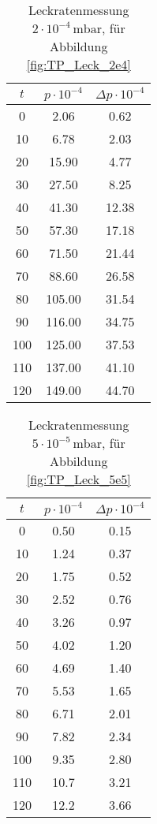 \begin{table}[H]
    \centering
    \caption{Leckratenmessung $2 \cdot 10^{-4} \, \si{\milli\bar}$, für Abbildung \ref{fig:TP_Leck_2e4}}
    \label{tab:TP_Leck_2e4}
    \begin{tabular}{c c c}
        \toprule
        {$t$} & {$p \cdot 10^{-4}$} & {$\Delta p \cdot 10^{-4}$} \\
        \midrule
        0 &   2.06 & 0.62\\
        10 &  6.78 & 2.03\\
        20 &  15.90 & 4.77\\
        30 &  27.50 & 8.25\\
        40 &  41.30 & 12.38\\
        50 &  57.30 & 17.18\\
        60 &  71.50 & 21.44\\
        70 &  88.60 & 26.58\\
        80 &  105.00 & 31.54\\
        90 &  116.00 & 34.75\\
        100 & 125.00 & 37.53\\
        110 & 137.00 & 41.10\\
        120 & 149.00 & 44.70\\
        \bottomrule
    \end{tabular}
\end{table}

\begin{table}[H]
    \centering
    \caption{Leckratenmessung $5 \cdot 10^{-5} \, \si{\milli\bar}$, für Abbildung \ref{fig:TP_Leck_5e5}}
    \label{tab:TP_Leck_5e5}
    \begin{tabular}{c c c}
        \toprule
        {$t$} & {$p \cdot 10^{-4}$} & {$\Delta p \cdot 10^{-4}$} \\
        \midrule
        0 &   0.50 & 0.15\\
        10 &  1.24 & 0.37\\
        20 &  1.75 & 0.52\\
        30 &  2.52 & 0.76\\
        40 &  3.26 & 0.97\\
        50 &  4.02 & 1.20\\
        60 &  4.69 & 1.40\\
        70 &  5.53 & 1.65\\
        80 &  6.71 & 2.01\\
        90 &  7.82 & 2.34\\
        100 & 9.35 & 2.80\\
        110 & 10.7 & 3.21\\
        120 & 12.2 & 3.66\\
        \bottomrule
    \end{tabular}
\end{table}

